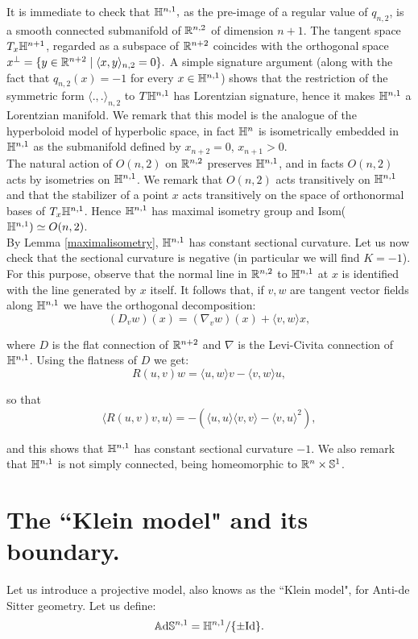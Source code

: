 It is immediate to check that $\mathbb{H}^{n,1},$ as the pre-image of a regular value of $q_{n,2}$, is a smooth connected submanifold of $\mathbb{R}^{n,2}$ of dimension $n+1$. The tangent space $T_x\mathbb{H}^{n+1}$, regarded as a subspace of $\mathbb{R}^{n+2}$ coincides with the orthogonal space $x^{\perp}=\{y\in \mathbb{R}^{n+2}\;|\;\langle x,y\rangle_{n,2}=0\}.$ A simple signature argument (along with the fact that $q_{n,2}(x)=-1$ for every $x\in\mathbb{H}^{n,1}$) shows that the restriction of the symmetric form $\langle .,. \rangle_{n,2}$ to $T\mathbb{H}^{n,1}$ has Lorentzian signature, hence it makes $\mathbb{H}^{n,1}$ a Lorentzian manifold. We remark that this model is the analogue of the hyperboloid model of hyperbolic space, in fact $\mathbb{H}^n$ is isometrically embedded in $\mathbb{H}^{n,1}$ as the submanifold defined by $x_{n+2}=0$, $x_{n+1}>0$. \\
The natural action of $O(n,2)$ on $\mathbb{R}^{n,2}$ preserves $\mathbb{H}^{n,1}$, and in facts $O(n,2)$ acts by isometries on $\mathbb{H}^{n,1}$. We remark that $O(n,2)$ acts transitively on $\mathbb{H}^{n,1}$ and that the stabilizer of a point $x$ acts transitively on the space of orthonormal bases of $T_x\mathbb{H}^{n,1}$. Hence $\mathbb{H}^{n,1}$ has maximal isometry group and Isom($\mathbb{H}^{n,1})\simeq O(n,2)$.\\
By Lemma \ref{maximalisometry}, $\mathbb{H}^{n,1}$ has constant sectional curvature. Let us now check that the sectional curvature is negative (in particular we will find $K=-1$). For this purpose, observe that the normal line in $\mathbb{R}^{n,2}$ to $\mathbb{H}^{n,1}$ at $x$ is identified with the line generated by $x$ itself. It follows that, if $v,w$ are tangent vector fields along $\mathbb{H}^{n,1}$ we have the orthogonal decomposition: 
\[
    (D_{v}w)(x)=(\nabla_{v}w)(x)+\langle v,w\rangle x, 
\]

where $D$ is the flat connection of $\mathbb{R}^{n+2}$ and $\nabla$ is the Levi-Civita connection of $\mathbb{H}^{n,1}$. Using the flatness of $D$ we get: 
\[
    R(u,v)w=\langle u,w\rangle v-\langle v,w\rangle u,
\]

so that 
\[
    \langle R(u,v)v,u \rangle =-(\langle u,u\rangle\langle v,v\rangle-\langle v,u\rangle^2), 
\]

and this shows that $\mathbb{H}^{n,1}$ has constant sectional curvature $-1$. We also remark that $\mathbb{H}^{n,1}$ is not simply connected, being homeomorphic to $\mathbb{R}^{n}\times \mathbb{S}^1$. 

\section{The ``Klein model" and its boundary.}
Let us introduce a projective model, also knows as the ``Klein model", for Anti-de Sitter geometry. Let us define: 
\[
    \mathbb{A}\mathrm{d}\mathbb{S}^{n,1}=\mathbb{H}^{n,1}/\{\pm \text{Id}\}.
\]

